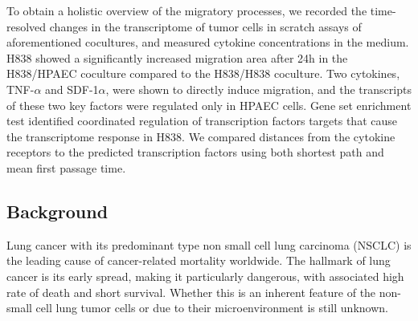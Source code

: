 To obtain a holistic overview of the migratory processes, 
we recorded the time-resolved changes in the transcriptome of tumor cells
in scratch assays of aforementioned cocultures, and measured
cytokine concentrations in the medium.
H838 showed a significantly increased migration area after 24h in the 
H838/HPAEC coculture compared to the H838/H838 coculture.
Two cytokines, TNF-$\alpha$ and SDF-1$\alpha$, were shown to directly 
induce migration, 
and the transcripts of these two key factors were regulated only 
in HPAEC cells.
Gene set enrichment test identified coordinated regulation
of transcription factors targets
that cause the transcriptome response in H838. 
We compared distances from the cytokine receptors to the predicted
transcription factors using both shortest path and mean first passage time.

\subsection{Background}
Lung cancer with its predominant type non small cell lung carcinoma 
(NSCLC) is the leading cause of cancer-related mortality worldwide.
The hallmark of lung cancer is its early spread, 
making it particularly dangerous, with associated high rate of death 
and short survival.
Whether this is an inherent feature of the non-small cell 
lung tumor cells or 
due to their microenvironment is still unknown. 

